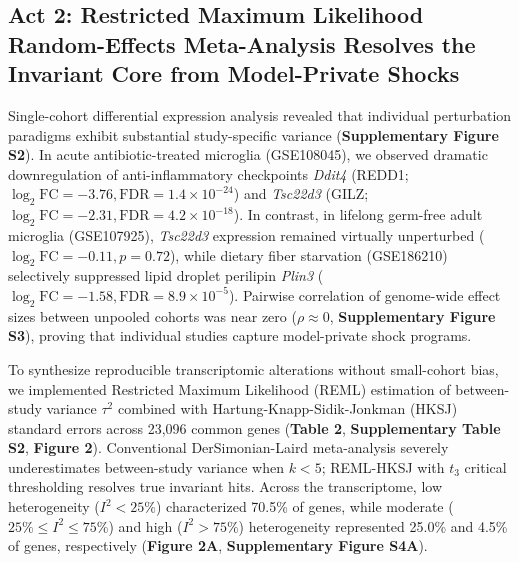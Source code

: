 \documentclass[10pt,a4paper]{article}
\begin{document}
\subsection{Act 2: Restricted Maximum Likelihood Random-Effects Meta-Analysis Resolves the Invariant Core from Model-Private Shocks}
Single-cohort differential expression analysis revealed that individual perturbation paradigms exhibit substantial study-specific variance (\textbf{Supplementary Figure S2}). In acute antibiotic-treated microglia (GSE108045), we observed dramatic downregulation of anti-inflammatory checkpoints \textit{Ddit4} (REDD1; $\log_2\text{FC} = -3.76, \text{FDR} = 1.4 \times 10^{-24}$) and \textit{Tsc22d3} (GILZ; $\log_2\text{FC} = -2.31, \text{FDR} = 4.2 \times 10^{-18}$). In contrast, in lifelong germ-free adult microglia (GSE107925), \textit{Tsc22d3} expression remained virtually unperturbed ($\log_2\text{FC} = -0.11, p = 0.72$), while dietary fiber starvation (GSE186210) selectively suppressed lipid droplet perilipin \textit{Plin3} ($\log_2\text{FC} = -1.58, \text{FDR} = 8.9 \times 10^{-5}$). Pairwise correlation of genome-wide effect sizes between unpooled cohorts was near zero ($\rho \approx 0$, \textbf{Supplementary Figure S3}), proving that individual studies capture model-private shock programs.

To synthesize reproducible transcriptomic alterations without small-cohort bias, we implemented Restricted Maximum Likelihood (REML) estimation of between-study variance $\tau^2$ combined with Hartung-Knapp-Sidik-Jonkman (HKSJ) standard errors across 23,096 common genes (\textbf{Table 2}, \textbf{Supplementary Table S2}, \textbf{Figure 2}). Conventional DerSimonian-Laird meta-analysis severely underestimates between-study variance when $k < 5$; REML-HKSJ with $t_3$ critical thresholding resolves true invariant hits. Across the transcriptome, low heterogeneity ($I^2 < 25\%$) characterized 70.5\% of genes, while moderate ($25\% \le I^2 \le 75\%$) and high ($I^2 > 75\%$) heterogeneity represented 25.0\% and 4.5\% of genes, respectively (\textbf{Figure 2A}, \textbf{Supplementary Figure S4A}). 
\end{document}
